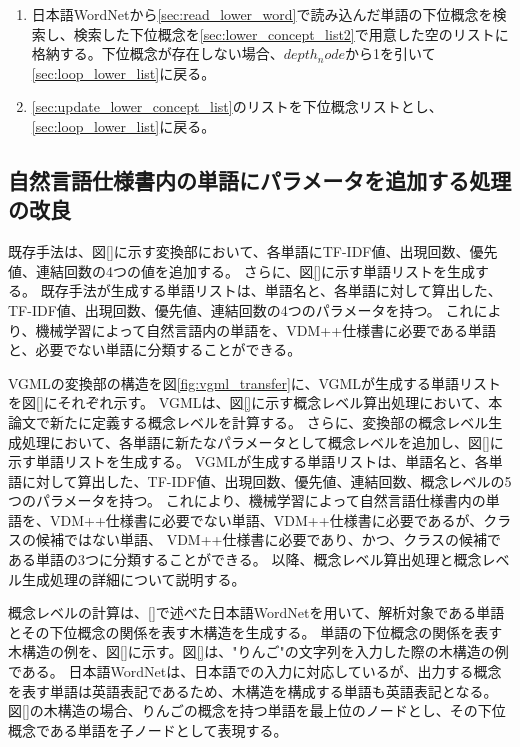 \begin{enumerate}
\begin{enumerate}
\begin{enumerate}
                    \label{sec:read_lower_word}
                    \item 日本語WordNetから\ref{sec:read_lower_word}で読み込んだ単語の下位概念を検索し、検索した下位概念を\ref{sec:lower_concept_list2}で用意した空のリストに格納する。下位概念が存在しない場合、$depth_node$から1を引いて\ref{sec:loop_lower_list}に戻る。
                    \label{sec:update_lower_concept_list}
                    \item \ref{sec:update_lower_concept_list}のリストを下位概念リストとし、\ref{sec:loop_lower_list}に戻る。
                \end{enumerate}
        \end{enumerate}
\end{enumerate}





\subsection{自然言語仕様書内の単語にパラメータを追加する処理の改良}
\label{sec:improve_word_list}
既存手法は、図\ref{}に示す変換部において、各単語にTF-IDF値、出現回数、優先値、連結回数の4つの値を追加する。
さらに、図\ref{}に示す単語リストを生成する。
既存手法が生成する単語リストは、単語名と、各単語に対して算出した、TF-IDF値、出現回数、優先値、連結回数の4つのパラメータを持つ。
これにより、機械学習によって自然言語内の単語を、VDM++仕様書に必要である単語と、必要でない単語に分類することができる。

VGMLの変換部の構造を図\ref{fig:vgml_transfer}に、VGMLが生成する単語リストを図\ref{}にそれぞれ示す。
VGMLは、図\ref{}に示す概念レベル算出処理において、本論文で新たに定義する概念レベルを計算する。
さらに、変換部の概念レベル生成処理において、各単語に新たなパラメータとして概念レベルを追加し、図\ref{}に示す単語リストを生成する。
VGMLが生成する単語リストは、単語名と、各単語に対して算出した、TF-IDF値、出現回数、優先値、連結回数、概念レベルの5つのパラメータを持つ。
これにより、機械学習によって自然言語仕様書内の単語を、VDM++仕様書に必要でない単語、VDM++仕様書に必要であるが、クラスの候補ではない単語、
VDM++仕様書に必要であり、かつ、クラスの候補である単語の3つに分類することができる。
以降、概念レベル算出処理と概念レベル生成処理の詳細について説明する。

概念レベルの計算は、\ref{}で述べた日本語WordNetを用いて、解析対象である単語とその下位概念の関係を表す木構造を生成する。
単語の下位概念の関係を表す木構造の例を、図\ref{}に示す。図\ref{}は、"りんご"の文字列を入力した際の木構造の例である。
日本語WordNetは、日本語での入力に対応しているが、出力する概念を表す単語は英語表記であるため、木構造を構成する単語も英語表記となる。
図\ref{}の木構造の場合、りんごの概念を持つ単語を最上位のノードとし、その下位概念である単語を子ノードとして表現する。

